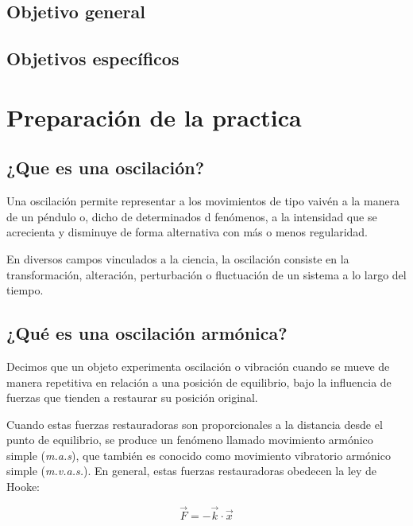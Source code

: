 \documentclass[twocolumn, 12pt]{article}
\begin{document}
\subsection{Objetivo general}

\subsection{Objetivos específicos}

\section{Preparación de la practica}

\subsection{¿Que es una oscilación?}

Una oscilación permite representar a los movimientos de
tipo vaivén a la manera de un péndulo o, dicho de
determinados d fenómenos, a la intensidad que se acrecienta
y disminuye de forma alternativa con más o menos
regularidad.

En diversos campos vinculados a la ciencia, la oscilación
consiste en la transformación, alteración, perturbación o
fluctuación de un sistema a lo largo del tiempo.

\nocite{definicion-oscilacion}

\subsection{¿Qué es una oscilación armónica?}

Decimos que un objeto experimenta oscilación o vibración
cuando se mueve de manera repetitiva en relación a una
posición de equilibrio, bajo la influencia de fuerzas que
tienden a restaurar su posición original.

Cuando estas fuerzas restauradoras son proporcionales a la
distancia desde el punto de equilibrio, se produce un
fenómeno llamado movimiento armónico simple
(\textit{m.a.s}), que también es conocido como movimiento
vibratorio armónico simple (\textit{m.v.a.s.}). En general,
estas fuerzas restauradoras obedecen la ley de Hooke:

{\large
\begin{equation}
    \vec{F} = -\vec{\textit{k}} \cdot \vec{x}
    \label{eq:ley-de-hooke}
\end{equation}
}
\end{document}
